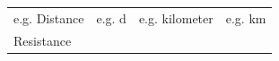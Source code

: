 \begin{enumerate}[noitemsep, label=\textbf{\arabic*}. ]
{\begin{tabular}[t]{|l|l|l|l|}
    
        e.g. Distance &
    
    
        e.g. d &
    
    
        e.g. kilometer &
    
    
        e.g. km%
     \tabularnewline\cline{1-1}\cline{2-2}\cline{3-3}\cline{4-4}
    
    
        Resistance &
    
    
         &
    
    
         &
    
    
     \tabularnewline\cline{1-1}\cline{2-2}\cline{3-3}\cline{4-4}
    

\end{tabular}}
\end{enumerate}
